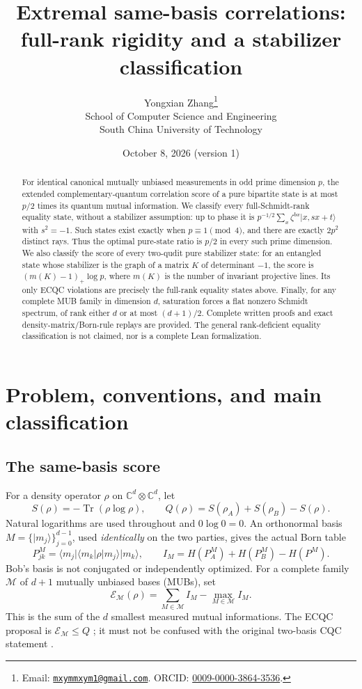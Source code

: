 \documentclass[11pt]{article}
\title{Extremal same-basis correlations:\protect\\ full-rank rigidity and a stabilizer classification}
\author{Yongxian Zhang\thanks{Email: \href{mailto:mxymmxym1@gmail.com}{\texttt{mxymmxym1@gmail.com}}. ORCID: \href{https://orcid.org/0009-0000-3864-3536}{0009-0000-3864-3536}.}\\[3pt]
\small School of Computer Science and Engineering\\
\small South China University of Technology}
\date{October 8, 2026 \quad (version 1)}
\theoremstyle{remark}\newtheorem{remark}[theorem]{Remark}
\newcommand{\C}{\mathbb C}
\newcommand{\M}{\mathcal M}
\newcommand{\E}{\mathcal E}
\newcommand{\ket}[1]{\lvert#1\rangle}
\newcommand{\bra}[1]{\langle#1\rvert}
\DeclareMathOperator{\Tr}{Tr}
\begin{document}
\maketitle
\begin{abstract}
For identical canonical mutually unbiased measurements in odd prime dimension $p$, the extended complementary-quantum correlation score of a pure bipartite state is at most $p/2$ times its quantum mutual information. We classify every full-Schmidt-rank equality state, without a stabilizer assumption: up to phase it is $p^{-1/2}\sum_x\zeta^{b x}\ket{x,sx+t}$ with $s^2=-1$. Such states exist exactly when $p\equiv1\pmod4$, and there are exactly $2p^2$ distinct rays. Thus the optimal pure-state ratio is $p/2$ in every such prime dimension. We also classify the score of every two-qudit pure stabilizer state: for an entangled state whose stabilizer is the graph of a matrix $K$ of determinant $-1$, the score is $(m(K)-1)_+\log p$, where $m(K)$ is the number of invariant projective lines. Its only ECQC violations are precisely the full-rank equality states above. Finally, for any complete MUB family in dimension $d$, saturation forces a flat nonzero Schmidt spectrum, of rank either $d$ or at most $(d+1)/2$. Complete written proofs and exact density-matrix/Born-rule replays are provided. The general rank-deficient equality classification is not claimed, nor is a complete Lean formalization.
\end{abstract}

\section{Problem, conventions, and main classification}
\subsection{The same-basis score}
For a density operator $\rho$ on $\C^d\otimes\C^d$, let
\[
 S(\rho)=-\Tr(\rho\log\rho),\qquad
 Q(\rho)=S(\rho_A)+S(\rho_B)-S(\rho).
\]
Natural logarithms are used throughout and $0\log0=0$. An orthonormal basis $M=\{\ket{m_j}\}_{j=0}^{d-1}$, used \emph{identically} on the two parties, gives the actual Born table
\[
 P^M_{jk}=\bra{m_j}\bra{m_k}\rho\ket{m_j}\ket{m_k},\qquad
 I_M=H(P^M_A)+H(P^M_B)-H(P^M).
\]
Bob's basis is not conjugated or independently optimized. For a complete family $\M$ of $d+1$ mutually unbiased bases (MUBs), set
\begin{equation}\label{eq:score}
 \E_\M(\rho)=\sum_{M\in\M}I_M-\max_{M\in\M}I_M.
\end{equation}
This is the sum of the $d$ smallest measured mutual informations. The ECQC proposal is $\E_\M\le Q$ \cite{iqbal}; it must not be confused with the original two-basis CQC statement \cite{schneeloch}.
\end{document}
